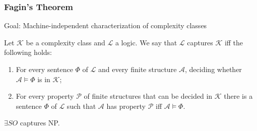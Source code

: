 \documentclass{beamer}
\newcommand{\L}{\mathcal{L}}
\newcommand{\K}{\mathcal{K}}
\newcommand{\A}{\mathcal{A}}
\newcommand{\P}{\mathcal{P}}
\begin{document}
\begin{frame}
	\titlepage
\end{frame}


\begin{frame}
	\frametitle{Fagin's Theorem}
	Goal: Machine-independent characterization of complexity classes
	\begin{definition}
		Let $\mathcal{K}$ be a complexity class and $\mathcal{L}$ a logic. We say that $\L$ captures $\K$ iff the following holds:
		\begin{enumerate}
			\item For every sentence $Φ$ of $\L$ and every finite structure $\A$, deciding whether $\A \vDash Φ$ is in $\K$;
			\item For every property $\P$ of finite structures that can be decided in $\K$ there is a sentence $Φ$ of $\L$ such that $\A$ has property $\P$ iff $\A \vDash Φ$.
		\end{enumerate}
	\end{definition}
	\begin{theorem}[Fagin]
		$∃SO$ captures NP.
	\end{theorem}
\end{frame}
\end{document}
